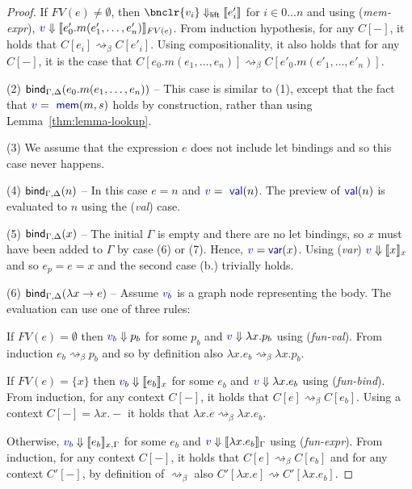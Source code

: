 \documentclass[sigplan,10pt,review,anonymous]{acmart}\settopmatter{printfolios=true,printccs=false,printacmref=false}
\theoremstyle{plain}
\theoremstyle{definition}
\newcommand{\ident}[1]{\textnormal{\sffamily #1}}
\newcommand{\bndclr}[1]{\textcolor{kvdclr}{#1}}
\newcommand{\bnd}[1]{\textnormal{\textcolor{kvdclr}{\sffamily #1}}}
\begin{document}
\begin{proof}
  If $FV(e)\neq\emptyset$, then $\bnclr{v_i} \Downarrow_\ident{lift} \llbracket e'_i \rrbracket$ for $i\in 0\ldots n$ and 
  using (\emph{mem-expr}), $\bndclr{v}\Downarrow \llbracket e'_0.m(e'_1, \ldots, e'_n) \rrbracket_{FV(e)}$.
  From induction hypothesis, for any $C[-]$, it holds that $C[e_i] \rightsquigarrow_\beta C[e'_i]$.
  Using compositionality, it also holds that for any $C[-]$, it is the case that
  $C[e_0.m(e_1, \ldots, e_n)] \rightsquigarrow_\beta C[e'_0.m(e'_1, \ldots, e'_n)]$.
  
\vspace{0.75em}\noindent(2) $\ident{bind}_{\Gamma, \Delta}(e_0.m(e_1, \ldots, e_n))$ --
  This case is similar to (1), except that the fact that $\bndclr{v} = \bnd{mem}(m, s)$
  holds by construction, rather than using Lemma~\ref{thm:lemma-lookup}.

\vspace{0.75em}\noindent(3) We assume that the expression $e$ does not include let bindings and
  so this case never happens.

\vspace{0.75em}\noindent(4) $\ident{bind}_{\Gamma, \Delta}(n)$ -- In this case $e=n$ and $\bndclr{v} = \bnd{val}(n)$. The preview of
  $\bnd{val}(n)$ is evaluated to $n$ using the (\emph{val}) case.

\vspace{0.75em}\noindent(5) $\ident{bind}_{\Gamma, \Delta}(x)$ -- The initial $\Gamma$ is empty and
  there are no let bindings, so $x$ must have been added to $\Gamma$ by case (6) or (7). Hence,
  $\bndclr{v}=\bnd{var}(x)$. Using (\emph{var}) $\bndclr{v}\Downarrow \llbracket x \rrbracket_{x}$
  and so $e_p = e = x$ and the second case (b.) trivially holds.  

\vspace{0.75em}\noindent(6) $\ident{bind}_{\Gamma, \Delta}(\lambda x\rightarrow e)$ -- Assume
  $\bndclr{v_b}$ is a graph node representing the body. The evaluation can use one of three rules: 
  
  If $FV(e)=\emptyset$ then $\bndclr{v_b}\Downarrow p_b$ for some $p_b$ and $\bndclr{v}\Downarrow \lambda x.p_b$ 
  using (\emph{fun-val}). From induction $e_b \rightsquigarrow_\beta p_b$
  and so by definition also $\lambda x.e_b \rightsquigarrow_\beta \lambda x.p_b$.

  If $FV(e)=\{x\}$ then $\bndclr{v_b}\Downarrow \llbracket e_b \rrbracket_x$ for some $e_b$ and
  $\bndclr{v}\Downarrow \lambda x.e_b$ using (\emph{fun-bind}). From 
  induction, for any context $C[-]$, it holds that $C[e] \rightsquigarrow_\beta C[e_b]$.
  Using a context $C[-]=\lambda x.-$ it holds that $\lambda x.e \rightsquigarrow_\beta \lambda x.e_b$.

  Otherwise, $\bndclr{v_b}\Downarrow \llbracket e_b \rrbracket_{x,\Gamma}$ for some $e_b$ and
  $\bndclr{v}\Downarrow \llbracket\lambda x.e_b\rrbracket_\Gamma$ using (\emph{fun-expr}). From
  induction, for any context $C[-]$, it holds that $C[e] \rightsquigarrow_\beta C[e_b]$ 
  and for any context $C'[-]$, by definition of $\rightsquigarrow_\beta$ also 
  $C'[\lambda x.e] \rightsquigarrow C'[\lambda x.e_b]$.
\end{proof}
\end{document}
